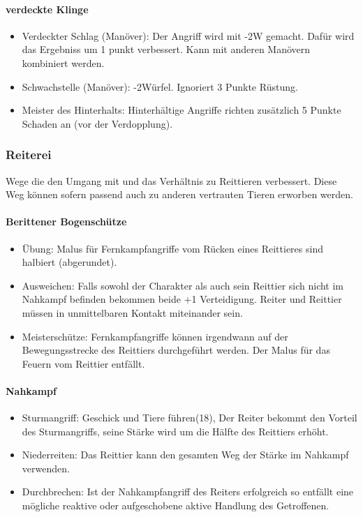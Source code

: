\documentclass{article}
\begin{document}
\paragraph{verdeckte Klinge}

\begin{itemize}
\item Verdeckter Schlag (Manöver): Der Angriff wird mit -2W gemacht. Dafür wird das Ergebniss um 1 punkt verbessert. Kann mit anderen Manövern kombiniert werden.
\item Schwachstelle (Manöver): -2Würfel. Ignoriert 3 Punkte Rüstung.
\item Meister des Hinterhalts: Hinterhältige Angriffe richten zusätzlich 5 Punkte Schaden an (vor der Verdopplung).
\end{itemize}

\subsubsection{Reiterei}

Wege die den Umgang mit und das Verhältnis zu Reittieren verbessert. Diese Weg können sofern passend auch zu anderen
vertrauten Tieren erworben werden.

\paragraph{Berittener Bogenschütze}

\begin{itemize}
\item Übung: Malus für Fernkampfangriffe vom Rücken eines Reittieres sind halbiert (abgerundet).
\item Ausweichen: Falls sowohl der Charakter als auch sein Reittier sich nicht im Nahkampf befinden bekommen beide +1 Verteidigung. Reiter und Reittier müssen in unmittelbaren Kontakt miteinander sein.
\item Meisterschütze: Fernkampfangriffe können irgendwann auf der Bewegungsstrecke des Reittiers durchgeführt werden. Der Malus für das Feuern vom Reittier entfällt.
\end{itemize}

\paragraph{Nahkampf}

\begin{itemize}
\item Sturmangriff: Geschick und Tiere führen(18), Der Reiter bekommt den Vorteil des Sturmangriffs, seine Stärke wird um die Hälfte des Reittiers erhöht.
\item Niederreiten: Das Reittier kann den gesamten Weg der Stärke im Nahkampf verwenden.
\item Durchbrechen: Ist der Nahkampfangriff des Reiters erfolgreich so entfällt eine mögliche reaktive oder aufgeschobene aktive Handlung des Getroffenen.
\end{itemize}
\end{document}
